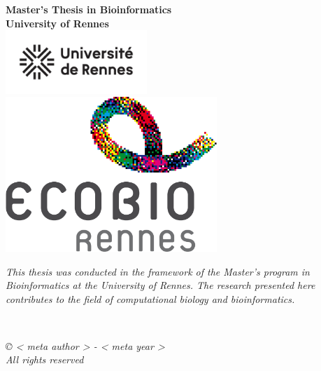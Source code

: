 \newpage  %
\thispagestyle{empty}  %
\begin{center}
  {\Huge \textbf{Master's Thesis in Bioinformatics}} \\[2cm]
  {\Large \textbf{University of Rennes}} \\[1cm]
  \includegraphics[width=0.4\textwidth]{figures/rapport/logo_Univ_Rennes.png} \\[1cm]
  \includegraphics[width=0.6\textwidth]{figures/rapport/couverture.png} \\[1cm]
  \begin{minipage}{0.8\textwidth}
    \centering
    \textit{This thesis was conducted in the framework of the Master's program in Bioinformatics at the University of Rennes. The research presented here contributes to the field of computational biology and bioinformatics.}
  \end{minipage} \\[1cm]
  \begin{minipage}{0.8\textwidth}
    \centering
    \small
    \textit{© {{< meta author >}} - {{< meta year >}} \\ All rights reserved}
  \end{minipage}
\end{center} 